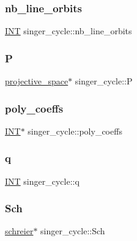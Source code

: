 \subsubsection{\texorpdfstring{nb\+\_\+line\+\_\+orbits}{nb\_line\_orbits}}
{\footnotesize\ttfamily \mbox{\hyperlink{galois_8h_a09fddde158a3a20bd2dcadb609de11dc}{I\+NT}} singer\+\_\+cycle\+::nb\+\_\+line\+\_\+orbits}

\mbox{\label{classsinger__cycle_a756303bf8d6a7ee315e2638e9eaf40d2}} 
\subsubsection{\texorpdfstring{P}{P}}
{\footnotesize\ttfamily \mbox{\hyperlink{classprojective__space}{projective\+\_\+space}}$\ast$ singer\+\_\+cycle\+::P}

\mbox{\label{classsinger__cycle_a46b9867155974b6c1c9e97260a7dd23f}} 
\subsubsection{\texorpdfstring{poly\+\_\+coeffs}{poly\_coeffs}}
{\footnotesize\ttfamily \mbox{\hyperlink{galois_8h_a09fddde158a3a20bd2dcadb609de11dc}{I\+NT}}$\ast$ singer\+\_\+cycle\+::poly\+\_\+coeffs}

\mbox{\label{classsinger__cycle_acf43c91893a248fa744ba90c825fbfbf}} 
\subsubsection{\texorpdfstring{q}{q}}
{\footnotesize\ttfamily \mbox{\hyperlink{galois_8h_a09fddde158a3a20bd2dcadb609de11dc}{I\+NT}} singer\+\_\+cycle\+::q}

\mbox{\label{classsinger__cycle_af6d99668472f183eb6274efdad83d84e}} 
\subsubsection{\texorpdfstring{Sch}{Sch}}
{\footnotesize\ttfamily \mbox{\hyperlink{classschreier}{schreier}}$\ast$ singer\+\_\+cycle\+::\+Sch}


